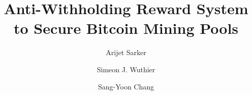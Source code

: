 \title{Anti-Withholding Reward System\\
to Secure Bitcoin Mining Pools}
%
%
\author{Arijet Sarker \and
Simeon J. Wuthier \and
Sang-Yoon Chang}

%

%
\maketitle              %
%
